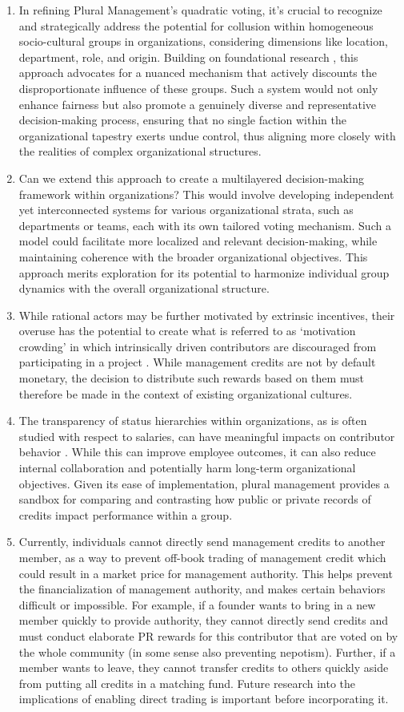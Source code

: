 \documentclass{article}
\begin{document}
\begin{enumerate}
    \item In refining Plural Management's quadratic voting, it's crucial to recognize and strategically address the potential for collusion within homogeneous socio-cultural groups in organizations, considering dimensions like location, department, role, and origin. Building on foundational research \cite{millerBeyond}, this approach advocates for a nuanced mechanism that actively discounts the disproportionate influence of these groups. Such a system would not only enhance fairness but also promote a genuinely diverse and representative decision-making process, ensuring that no single faction within the organizational tapestry exerts undue control, thus aligning more closely with the realities of complex organizational structures.
    \item Can we extend this approach to create a multilayered decision-making framework within organizations? This would involve developing independent yet interconnected systems for various organizational strata, such as departments or teams, each with its own tailored voting mechanism. Such a model could facilitate more localized and relevant decision-making, while maintaining coherence with the broader organizational objectives. This approach merits exploration for its potential to harmonize individual group dynamics with the overall organizational structure.
    \item While rational actors may be further motivated by extrinsic incentives, their overuse has the potential to create what is referred to as `motivation crowding' in which intrinsically driven contributors are discouraged from participating in a project \cite{frey2000motivation}. While management credits are not by default monetary, the decision to distribute such rewards based on them must therefore be made in the context of existing organizational cultures.
    \item The transparency of status hierarchies within organizations, as is often studied with respect to salaries, can have meaningful impacts on contributor behavior \cite{cullen2023pay}. While this can improve employee outcomes, it can also reduce internal collaboration and potentially harm long-term organizational objectives. Given its ease of implementation, plural management provides a sandbox for comparing and contrasting how public or private records of credits impact performance within a group.
    \item Currently, individuals cannot directly send management credits to another member, as a way to prevent off-book trading of management credit which could result in a market price for management authority. This helps prevent the financialization of management authority, and makes certain behaviors difficult or impossible. For example, if a founder wants to bring in a new member quickly to provide authority, they cannot directly send credits and must conduct elaborate PR rewards for this contributor that are voted on by the whole community (in some sense also preventing nepotism). Further, if a member wants to leave, they cannot transfer credits to others quickly aside from putting all credits in a matching fund. Future research into the implications of enabling direct trading is important before incorporating it.

\end{enumerate}
\end{document}
